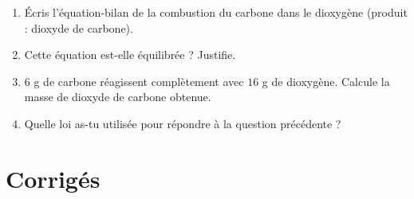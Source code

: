 \begin{enumerate}[label=\arabic*)]
\item Écris l'équation-bilan de la combustion du carbone dans le dioxygène (produit :
dioxyde de carbone).
\item Cette équation est-elle équilibrée ? Justifie.
\item $6$ g de carbone réagissent complètement avec $16$ g de dioxygène. Calcule la masse
de dioxyde de carbone obtenue.
\item Quelle loi as-tu utilisée pour répondre à la question précédente ?
\end{enumerate}

\section{Corrigés}
